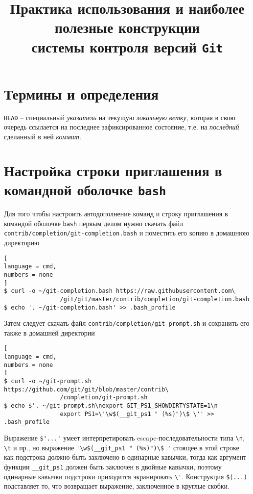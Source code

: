 \documentclass[%
	11pt,
	a4paper,
	utf8,
		]{article}
\begin{document}
\title{Практика использования и наиболее полезные конструкции\\системы контроля версий  \texttt{Git}}

\author{}

\date{}
\maketitle

\thispagestyle{fancy}

\tableofcontents


\section{Термины и определения}

\noindent\texttt{HEAD} -- специальный \textit{указатель} на текущую \emph{локальную ветку}, которая в свою очередь ссылается на последнее зафиксированное состояние, т.е. на \emph{последний} сделанный в ней \emph{коммит}. 

\section{Настройка строки приглашения в командной оболочке \texttt{bash}}

Для того чтобы настроить автодополнение команд и строку приглашения в командой оболочке \texttt{bash} первым делом нужно скачать файл \texttt{contrib/completion/git-completion.bash} и поместить его копию в домашнюю директорию
\begin{lstlisting}[
language = cmd,
numbers = none
]
$ curl -o ~/git-completion.bash https://raw.githubusercontent.com\
                /git/git/master/contrib/completion/git-completion.bash
$ echo '. ~/git-completion.bash' >> .bash_profile
\end{lstlisting}

Затем следует скачать файл \texttt{contrib/completion/git-prompt.sh} и сохранить его также в домашней директории
\begin{lstlisting}[
language = cmd,
numbers = none
]
$ curl -o ~/git-prompt.sh https://github.com/git/git/blob/master/contrib\
                /completion/git-prompt.sh
$ echo $'. ~/git-prompt.sh\nexport GIT_PS1_SHOWDIRTYSTATE=1\n
                export PS1=\'\w$(__git_ps1 " (%s)")\$ \'' >> .bash_profile
\end{lstlisting}

Выражение \verb|$'...'| умеет интерпретировать escape-последовательности типа \verb|\n|, \verb|\t| и пр., но выражение \verb|'\w$(__git_ps1 " (%s)")\$ '| стоящее в этой строке как подстрока должно быть заключено в одинарные кавычки, тогда как аргумент функции \verb|__git_ps1| должен быть заключен в двойные кавычки, поэтому одинарные кавычки подстроки приходится экранировать \verb|\'|. Конструкция \verb|$(...)| подставляет то, что возвращает выражение, заключенное в круглые скобки.
\end{document}
